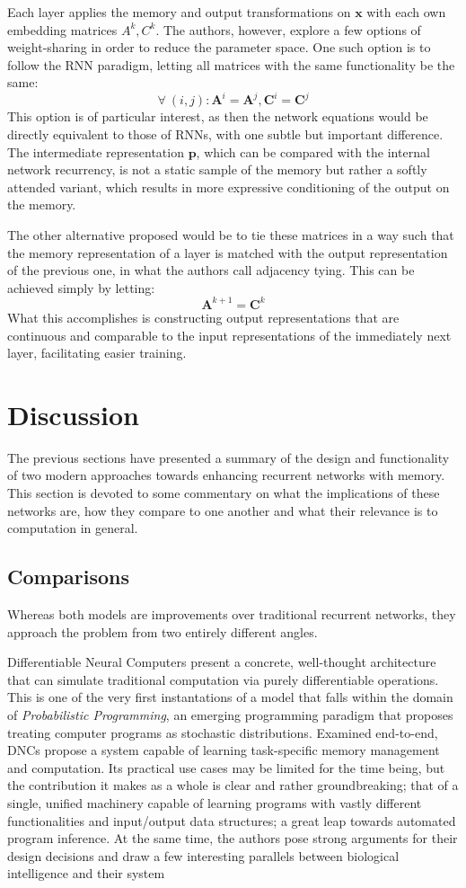 \documentclass[]{article}
\begin{document}
Each layer applies the memory and output transformations on $\pmb{x}$ with each own embedding matrices $A^k, C^k$. The authors, however, explore a few options of weight-sharing in order to reduce the parameter space. One such option is to follow the RNN paradigm, letting all matrices with the same functionality be the same:
\[
\tag{RNN-Tying}
\forall \ (i,j): \pmb{A}^i = \pmb{A}^j, \pmb{C}^i = \pmb{C}^j
\]
This option is of particular interest, as then the network equations would be directly equivalent to those of RNNs, with one subtle but important difference. The intermediate representation $\pmb{p}$, which can be compared with the internal network recurrency, is not a static sample of the memory but rather a softly attended variant, which results in more expressive conditioning of the output on the memory. 

The other alternative proposed would be to tie these matrices in a way such that the memory representation of a layer is matched with the output representation of the previous one, in what the authors call adjacency tying. This can be achieved simply by letting:
\[
\tag{Adjacency Tying}
\pmb{A}^{k+1} = \pmb{C}^k
\]
What this accomplishes is constructing output representations that are continuous and comparable to the input representations of the immediately next layer, facilitating easier training.

\section{Discussion}
\label{Comp}
The previous sections have presented a summary of the design and functionality of two modern approaches towards enhancing recurrent networks with memory. This section is devoted to some commentary on what the implications of these networks are, how they compare to one another and what their relevance is to computation in general.

\subsection{Comparisons}
Whereas both models are improvements over traditional recurrent networks, they approach the problem from two entirely different angles. 

Differentiable Neural Computers present a concrete, well-thought architecture that can simulate traditional computation via purely differentiable operations. This is one of the very first instantations of a model that falls within the domain of \textit{Probabilistic Programming}\cite{Meijer}, an emerging programming paradigm that proposes treating computer programs as stochastic distributions. Examined end-to-end, DNCs propose a system capable of learning task-specific memory management and computation. Its practical use cases may be limited for the time being, but the contribution it makes as a whole is clear and rather groundbreaking; that of a single, unified machinery capable of learning programs with vastly different functionalities and input/output data structures; a great leap towards automated program inference. At the same time, the authors pose strong arguments for their design decisions and draw a few interesting parallels between biological intelligence and their system
\end{document}
